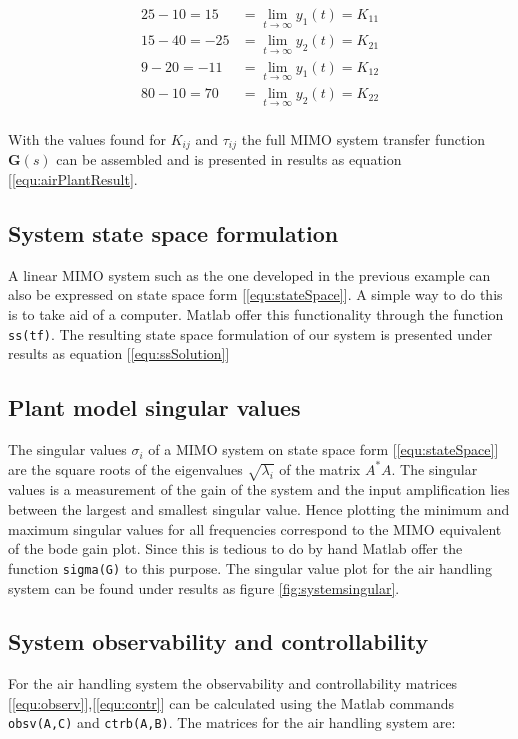 \documentclass[a4paper, titlepage]{article}
\begin{document}
\begin{equation}
\begin{split}
25 - 10 = 15 &= 
\lim_{t \to \infty} y_{1}(t) = 
K_{11} \\
15 - 40 = -25 &= 
\lim_{t \to \infty} y_{2}(t) = 
K_{21} \\
9 - 20 = -11 &= 
\lim_{t \to \infty} y_{1}(t) = 
K_{12} \\
80 - 10 = 70 &= 
\lim_{t \to \infty} y_{2}(t) = 
K_{22} \\
\end{split}
\end{equation}

With the values found for $K_{ij}$ and $\tau_{ij}$ the full MIMO system transfer function $\boldsymbol{G}(s)$ can be assembled and is presented in results as equation [\ref{equ:airPlantResult}.

\subsection{System state space formulation}
\label{sec:stateSpace}
A linear MIMO system such as the one developed in the previous example can also be expressed on state space form [\ref{equ:stateSpace}].
A simple way to do this is to take aid of a computer.
Matlab offer this functionality through the function \verb|ss(tf)|.
The resulting state space formulation of our system is presented under results as equation [\ref{equ:ssSolution}]

\subsection{Plant model singular values}
\label{sec:plantSingularValues}
The singular values $\sigma_i$ of a MIMO system on state space form [\ref{equ:stateSpace}] are the square roots of the eigenvalues $\sqrt{\lambda_i}$ of the matrix $A^*A$.
The singular values is a measurement of the gain of the system and the input amplification lies between the largest and smallest singular value.
Hence plotting the minimum and maximum singular values for all frequencies correspond to the MIMO equivalent of the bode gain plot.
Since this is tedious to do by hand Matlab offer the function \verb|sigma(G)| to this purpose.
The singular value plot for the air handling system can be found under results as figure \ref{fig:systemsingular}.

\subsection{System observability and controllability}
For the air handling system the observability and controllability matrices [\ref{equ:observ}],[\ref{equ:contr}] can be calculated using the Matlab commands \verb|obsv(A,C)| and \verb|ctrb(A,B)|.
The matrices for the air handling system are:
\end{document}
